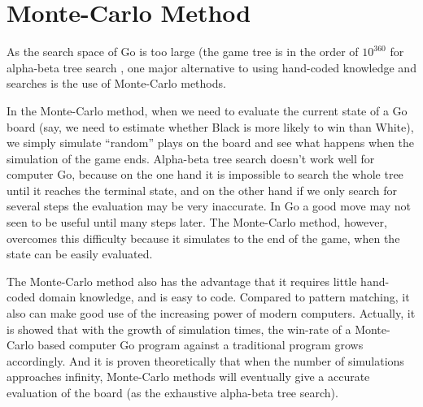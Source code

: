 

\section{Monte-Carlo Method}
As the search space of Go is too large (the game tree is in the order of $10^360$ for alpha-beta tree search \cite{bouzy2001computer}, one major alternative to using hand-coded knowledge and searches is the use of Monte-Carlo methods.

In the Monte-Carlo method, when we need to evaluate the current state of a Go board (say, we need to estimate whether Black is more likely to win than White), we simply simulate ``random'' plays on the board and see what happens when the simulation of the game ends. Alpha-beta tree search doesn't work well for computer Go, because on the one hand it is impossible to search the whole tree until it reaches the terminal state, and on the other hand if we only search for several steps the evaluation may be very inaccurate. In Go a good move may not seen to be useful until many steps later. The Monte-Carlo method, however, overcomes this difficulty because it simulates to the end of the game, when the state can be easily evaluated.

The Monte-Carlo method also has the advantage that it requires little hand-coded domain knowledge, and is easy to code. Compared to pattern matching, it also can make good use of the increasing power of modern computers. Actually, it is showed that with the growth of simulation times, the win-rate of a Monte-Carlo based computer Go program against a traditional program grows accordingly\cite{enzenberger2010fuego}. And it is proven theoretically that when the number of simulations approaches infinity, Monte-Carlo methods will eventually give a accurate evaluation of the board (as the exhaustive alpha-beta tree search)\cite{kocsis2006bandit}.

